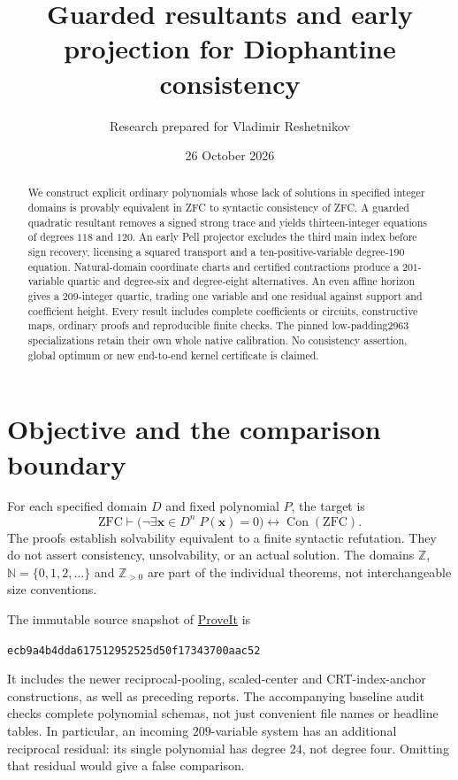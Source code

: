 \documentclass[11pt]{article}
\title{Guarded resultants and early projection for Diophantine consistency}
\author{Research prepared for Vladimir Reshetnikov}
\date{26 October 2026}
\theoremstyle{definition}\newtheorem{definition}[theorem]{Definition}
\theoremstyle{remark}\newtheorem{remark}[theorem]{Remark}
\newcommand{\Z}{\mathbb Z}\newcommand{\N}{\mathbb N}
\newcommand{\Con}{\operatorname{Con}}
\begin{document}
\maketitle
\begin{abstract}
We construct explicit ordinary polynomials whose lack of solutions in
specified integer domains is provably equivalent in ZFC to syntactic
consistency of ZFC. A guarded quadratic resultant removes a signed strong
trace and yields thirteen-integer equations of degrees $118$ and $120$.
An early Pell projector excludes the third main index before sign recovery,
licensing a squared transport and a ten-positive-variable degree-$190$
equation. Natural-domain coordinate charts and certified contractions
produce a $201$-variable quartic and degree-six and degree-eight alternatives.
An even affine horizon gives a $209$-integer quartic, trading one
variable and one residual against support and coefficient height.
Every result includes complete coefficients or circuits, constructive maps,
ordinary proofs and reproducible finite checks. The pinned low-padding2963
specializations retain their own whole native calibration. No consistency
assertion, global optimum or new end-to-end kernel certificate is claimed.
\end{abstract}
\tableofcontents
\section{Objective and the comparison boundary}
For each specified domain $D$ and fixed polynomial $P$, the target is
\[
\mathrm{ZFC}\vdash
\bigl(\neg\exists\boldsymbol{x}\in D^n\;P(\boldsymbol{x})=0\bigr)
\longleftrightarrow\Con(\mathrm{ZFC}).
\]
The proofs establish solvability equivalent to a finite syntactic
refutation. They do not assert consistency, unsolvability, or an actual
solution. The domains $\Z$, $\N=\{0,1,2,\ldots\}$ and $\Z_{>0}$ are
part of the individual theorems, not interchangeable size conventions.

The immutable source snapshot of
\href{https://github.com/VladimirReshetnikov/ProveIt}{ProveIt} is
\begin{center}\small\texttt{ecb9a4b4dda617512952525d50f17343700aac52}\end{center}
It includes the newer reciprocal-pooling, scaled-center and CRT-index-anchor
constructions, as well as preceding reports. The accompanying baseline
audit checks complete polynomial schemas, not just convenient file names
or headline tables. In particular, an incoming $209$-variable system has
an additional reciprocal residual: its single polynomial has degree $24$,
not degree four. Omitting that residual would give a false comparison.
\end{document}
